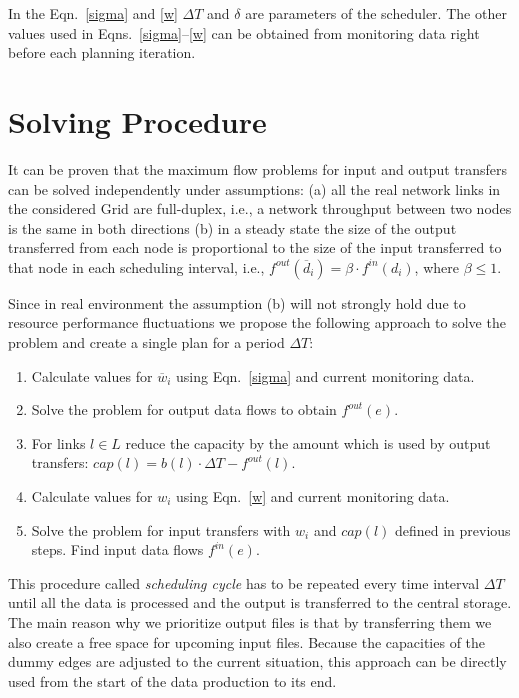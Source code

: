 \documentclass{svjour3}                     %
\begin{document}
%

In the Eqn.~\ref{sigma} and \ref{w} $\Delta T$ and $\delta$ are parameters of the scheduler. The other values used in
Eqns.~\ref{sigma}--\ref{w} can be obtained from monitoring data right before each planning iteration.

\section{Solving Procedure}
\label{solve}
It can be proven that the maximum flow problems for input and output transfers
can be solved independently under assumptions: (a) all the real network links
in the considered Grid are full-duplex, i.e., a network throughput between two
nodes is the same in both directions (b) in a steady state the size of the
output transferred from each node is proportional to the size of the input
transferred to that node in each scheduling interval, i.e.,
$f^{out}(\overline{d}_{i})= \beta \cdot f^{in}(d_{i})$, where $\beta \leq 1$.

Since in real environment the assumption (b) will not strongly hold due to
resource performance fluctuations we propose the following approach to
solve the problem and create a single plan for a period $\Delta T$:
%
\begin{enumerate}
\item Calculate values for $\overline{w}_{i}$ using Eqn.~\ref{sigma} and current monitoring data.
\item Solve the problem for output data flows to obtain $f^{out}(e)$.
\item For links $l \in L$ reduce the capacity by the amount which is used by output transfers: $cap(l) = b(l) \cdot \Delta T - f^{out}(l)$.
\item Calculate values for $w_{i}$ using Eqn.~\ref{w} and current monitoring data.
\item Solve the problem for input transfers with $w_{i}$ and $cap(l)$ defined in previous steps. Find input data flows $f^{in}(e)$.
\end{enumerate}
%
This procedure called {\it scheduling cycle} has to be repeated every time interval $\Delta T$ until all the data is processed and the output is transferred to the central storage. The main reason why we prioritize output files is that by transferring them we also create a free space for upcoming input files. Because the capacities of the dummy edges are adjusted to the current situation, this approach can be directly used from the start of the data production to its end.
\end{document}
